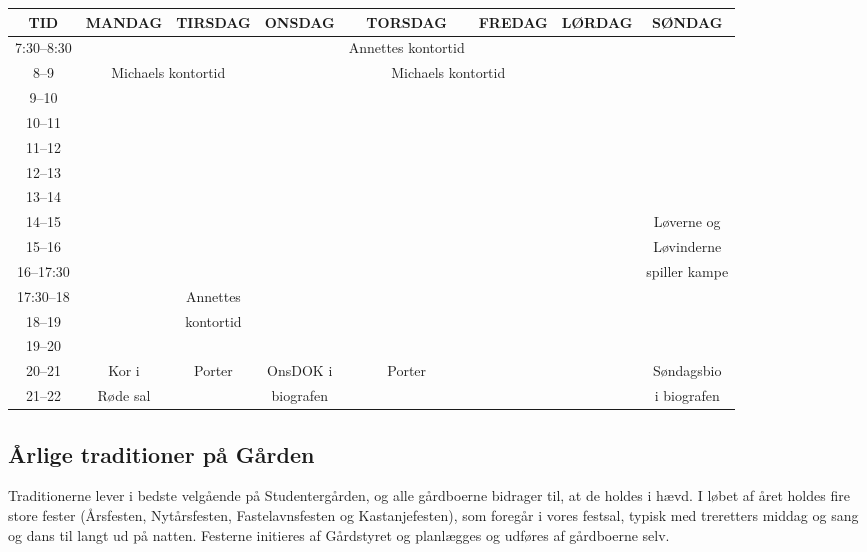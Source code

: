 \documentclass[11pt,article,twoside,openany,danish,extrafontsizes]{memoir} %
\begin{document}
\begin{landscape}
\begin{table}[p]
\begin{center}
\begin{tabular}{|>{\sffamily}c|c|c|c|c|c|c|c|}
\hline
\textsf{TID}		&	\textsf{MANDAG}	& \textsf{TIRSDAG}	& \textsf{ONSDAG}	& \textsf{TORSDAG}	& \textsf{FREDAG}	& \textsf{LØRDAG}	& \textsf{SØNDAG} \\ \hline
\rowcolor{SG-dark!4} 7:30--8:30 & & & & Annettes kontortid & & & \\ \hline
\rowcolor{SG-dark!10} 8--9	& \multicolumn{2}{|c|}{Michaels kontortid}	& & \multicolumn{2}{|c|}{Michaels kontortid} & & \\ \hline
\rowcolor{SG-dark!05} 9--10	& & & & & & & \\ \hline
\rowcolor{SG-dark!10} 10--11	& & & & & & & \\ \hline
\rowcolor{SG-dark!15} 11--12	& & & & & & & \\ \hline
\rowcolor{SG-dark!20} 12--13	& & & & & & & \\ \hline
\rowcolor{SG-dark!25} 13--14	& & & & & & & \\ \hline
\rowcolor{SG-dark!30} 14--15	& & & & & & & Løverne og \\ \cline{1-7}
\rowcolor{SG-dark!35} 15--16	& & & & & & & Løvinderne \\ \cline{1-7}
\rowcolor{SG-dark!40} 16--17:30	& & & & & & & spiller kampe \\ \hline
\rowcolor{SG-dark!45} 17:30--18	& & Annettes & & & & & \\ \cline{1-2} \cline{4-4} \cline{6-8}
\rowcolor{SG-dark!50} 18--19	& & kontortid & & & & & \\ \hline
\rowcolor{SG-dark!55} 19--20	& & & & & & & \\ \hline
\rowcolor{SG-dark!60} 20--21	& Kor i & Porter & OnsDOK i & Porter & & & Søndagsbio \\ \cline{1-1} \cline{6-8}
\rowcolor{SG-dark!65} 21--22	& Røde sal & & biografen & & & & i biografen \\ \hline
\end{tabular}
\end{center}
\end{table}
\end{landscape}


\subsection{Årlige traditioner på Gården}
Traditionerne lever i bedste velgående på Studentergården, og alle gårdboerne bidrager til, at de holdes i hævd. I løbet af året holdes fire store fester (Årsfesten, Nytårsfesten, Fastelavnsfesten og Kastanjefesten), som foregår i vores festsal, typisk med treretters middag og sang og dans til langt ud på natten. Festerne initieres af Gårdstyret og planlægges og udføres af gårdboerne selv.
\end{document}
